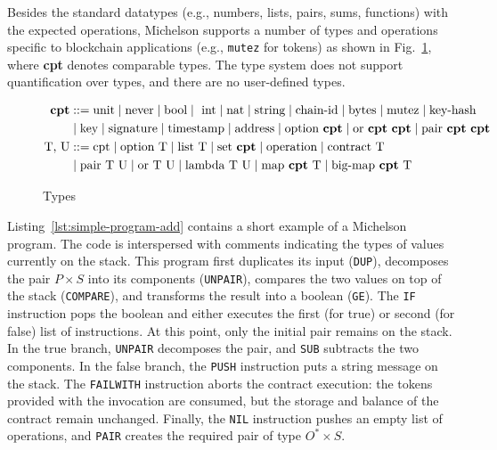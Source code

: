 \documentclass[runningheads]{llncs}
\begin{document}
Besides the standard datatypes (e.g., numbers, lists, pairs, sums, functions) with the expected operations, Michelson supports a number of types and operations specific to blockchain applications (e.g., \texttt{mutez} for tokens) as shown in Fig.~\ref{fig:types}, where \textbf{cpt} denotes comparable types. The type system does not support quantification over types, and there are no user-defined types.
\begin{figure}[tp]
\begin{align*}
\textbf{cpt} &::= 
   \text{unit} 
   \mid\text{never} 
   \mid\text{bool} 
   \mid\ \text{int}
   \mid\text{nat}
   \mid\text{string}
   \mid\text{chain-id} 
    \mid\text{bytes}
   \mid\text{mutez} 
   \mid\text{key-hash} \\
   &\mid\text{key}
   \mid \text{signature}
   \mid \text{timestamp} 
   \mid \text{address} 
   \mid \text{option}\ \textbf{cpt}
   \mid \text{or}\ \textbf{cpt}\ \textbf{cpt}
   \mid \text{pair}\ \textbf{cpt}\ \textbf{cpt} \\
\text{T, U} &::= 
    \text{cpt}
   \mid \text{option}\ \text{T}
   \mid \text{list}\ \text{T}
   \mid \text{set}\ \textbf{cpt} 
   \mid \text{operation} 
   \mid \text{contract}\ \text{T} \\
  & \mid \text{pair}\ \text{T}\ \text{U}
   \mid \text{or}\ \text{T}\ \text{U}
   \mid \text{lambda}\ \text{T}\ \text{U} 
   \mid \text{map}\ \textbf{cpt}\ \text{T}
   \mid \text{big-map}\ \textbf{cpt}\ \text{T}
\end{align*}
\caption{Types}
\label{fig:types}
\end{figure}

Listing~\ref{lst:simple-program-add} contains a short example of a Michelson program. The code is interspersed with comments indicating the types of values currently on the stack. This program first duplicates its input (\lstinline|DUP|), decomposes the pair $P \times S$ into its components (\lstinline|UNPAIR|), compares the two values on top of the stack (\lstinline|COMPARE|), and transforms the result into a boolean (\lstinline|GE|). The \lstinline|IF| instruction pops the boolean and either executes the first (for true) or second (for false) list of instructions. At this point, only the initial pair remains on the stack. In the true branch, \lstinline|UNPAIR| decomposes the pair, and \lstinline|SUB| subtracts the two components. In the false branch, the \lstinline|PUSH| instruction puts a string message on the stack. The \lstinline|FAILWITH| instruction aborts the contract execution: the tokens provided with the invocation are consumed, but the storage and balance of the contract remain unchanged. Finally, the \lstinline|NIL| instruction pushes an empty list of operations, and \lstinline|PAIR| creates the required pair of type $O^* \times S$.
\end{document}
